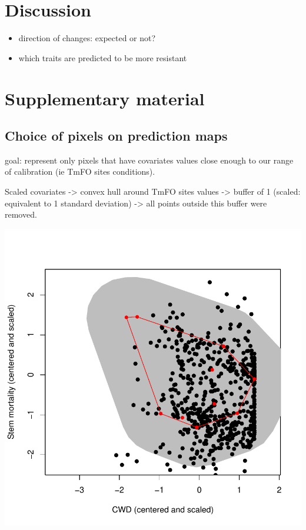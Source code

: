 \documentclass[]{elsarticle} %
\makeatletter
\def\maxwidth{\ifdim\Gin@nat@width>\linewidth\linewidth
\else\Gin@nat@width\fi}
\let\Oldincludegraphics\includegraphics
\renewcommand{\includegraphics}[1]{\Oldincludegraphics[width=\maxwidth]{#1}}
\makeatother
\begin{document}
\section{Discussion}\label{discussion}

\begin{itemize}
\item
  direction of changes: expected or not?
\item
  which traits are predicted to be more resistant
\end{itemize}

\section{Supplementary material}\label{supplementary-material}

\subsection{Choice of pixels on prediction
maps}\label{choice-of-pixels-on-prediction-maps}

goal: represent only pixels that have covariates values close enough to
our range of calibration (ie TmFO sites conditions).

Scaled covariates -\textgreater{} convex hull around TmFO sites values
-\textgreater{} buffer of 1 (scaled: equivalent to 1 standard deviation)
-\textgreater{} all points outside this buffer were removed.

\includegraphics{rticle_tmfo_functional_files/figure-latex/pixel_choice-1.pdf}
\end{document}
